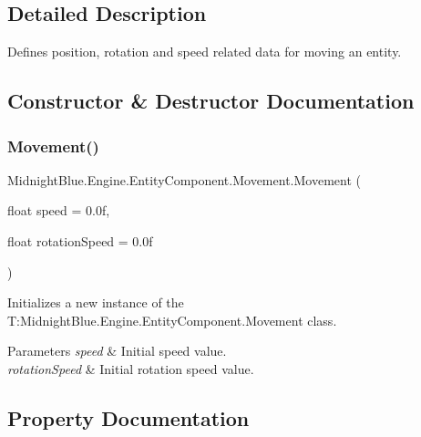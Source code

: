 \subsection{Detailed Description}
Defines position, rotation and speed related data for moving an entity. 



\subsection{Constructor \& Destructor Documentation}
\hypertarget{class_midnight_blue_1_1_engine_1_1_entity_component_1_1_movement_a36a4bcca5a6f471b5ddd8b5dad063dfd}{}\label{class_midnight_blue_1_1_engine_1_1_entity_component_1_1_movement_a36a4bcca5a6f471b5ddd8b5dad063dfd} 
\subsubsection{\texorpdfstring{Movement()}{Movement()}}
{\footnotesize\ttfamily Midnight\+Blue.\+Engine.\+Entity\+Component.\+Movement.\+Movement (\begin{DoxyParamCaption}\item[{float}]{speed = {\ttfamily 0.0f},  }\item[{float}]{rotation\+Speed = {\ttfamily 0.0f} }\end{DoxyParamCaption})\hspace{0.3cm}{\ttfamily [inline]}}



Initializes a new instance of the T\+:\+Midnight\+Blue.\+Engine.\+Entity\+Component.\+Movement class. 


\begin{DoxyParams}{Parameters}
{\em speed} & Initial speed value.\\
\hline
{\em rotation\+Speed} & Initial rotation speed value.\\
\hline
\end{DoxyParams}


\subsection{Property Documentation}
\hypertarget{class_midnight_blue_1_1_engine_1_1_entity_component_1_1_movement_af4db35a6662c9becc7d8a6f5a939954f}{}\label{class_midnight_blue_1_1_engine_1_1_entity_component_1_1_movement_af4db35a6662c9becc7d8a6f5a939954f} 
